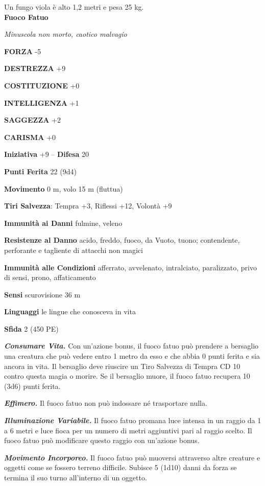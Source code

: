 \begin{multicols}{2}
Un fungo viola è alto 1,2 metri e pesa 25 kg.\\


\medskip{}\textbf{Fuoco Fatuo}

\emph{Minuscola non morto, caotico malvagio}

\textbf{FORZA} -5

\textbf{DESTREZZA} +9

\textbf{COSTITUZIONE} +0

\textbf{INTELLIGENZA} +1

\textbf{SAGGEZZA} +2

\textbf{CARISMA} +0

\textbf{Iniziativa} +9 -- \textbf{Difesa} 20

\textbf{Punti Ferita} 22 (9d4)

\textbf{Movimento} 0 m, volo 15 m (fluttua)

\textbf{Tiri Salvezza}: Tempra +3, Riflessi +12, Volontà +9

\textbf{Immunità ai Danni} fulmine, veleno

\textbf{Resistenze al Danno} acido, freddo, fuoco, da Vuoto, tuono; contendente, perforante e tagliente di attacchi non magici

\textbf{Immunità alle Condizioni} afferrato, avvelenato, intralciato, paralizzato, privo di sensi, prono, affaticamento

\textbf{Sensi} scurovisione 36 m

\textbf{Linguaggi} le lingue che conosceva in vita

\textbf{Sfida} 2 (450 PE)

\emph{\textbf{Consumare Vita.}} Con un'azione bonus, il fuoco fatuo può prendere a bersaglio una creatura che può vedere entro 1 metro da esso e che abbia 0 punti ferita e sia ancora in vita. Il bersaglio deve riuscire un Tiro Salvezza di Tempra CD 10 contro questa magia o morire. Se il bersaglio muore, il fuoco fatuo recupera 10 (3d6) punti ferita.

\emph{\textbf{Effimero.}} Il fuoco fatuo non può indossare né trasportare nulla.

\emph{\textbf{Illuminazione Variabile.}} Il fuoco fatuo promana luce intensa in un raggio da 1 a 6 metri e luce fioca per un numero di metri aggiuntivi pari al raggio scelto. Il fuoco fatuo può modificare questo raggio con un'azione bonus.

\emph{\textbf{Movimento Incorporeo.}} Il fuoco fatuo può muoversi attraverso altre creature e oggetti come se fossero terreno difficile. Subisce 5 (1d10) danni da forza se termina il suo turno all'interno di un oggetto.


\end{multicols}
